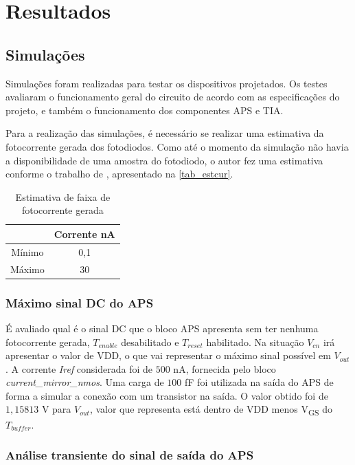 \chapter{Resultados}

\section{Simulações}

Simulações foram realizadas para testar os dispositivos projetados. Os testes avaliaram o funcionamento geral do circuito de acordo com as especificações do projeto, e também o funcionamento dos componentes APS e TIA.

Para a realização das simulações, é necessário se realizar uma estimativa da fotocorrente gerada dos fotodiodos. Como até o momento da simulação não havia a disponibilidade de uma amostra do fotodiodo, o autor fez uma estimativa conforme o trabalho de \cite{LidianeCampos}, apresentado na \autoref{tab_estcur}.

\begin{table}[!h]
\caption{Estimativa de faixa de fotocorrente gerada}
\label{tab_estcur}
\centering
\begin{tabular}{cc}
\toprule
& Corrente nA \\
\midrule \midrule
Mínimo & 0,1\\
\midrule
Máximo & 30\\
\bottomrule
\end{tabular}
\end{table}

\subsection{Máximo sinal DC do APS}
\label{DCAPS}

É avaliado qual é o sinal DC que o bloco APS apresenta sem ter nenhuma fotocorrente gerada, $T_{enable}$ desabilitado e $T_{reset}$ habilitado. Na situação $V_{cn}$ irá apresentar o valor de VDD, o que vai representar o máximo sinal possível em $V_{out}$. A corrente \textit{Iref} considerada foi de $500$ nA, fornecida pelo bloco \textit{current\_mirror\_nmos}. Uma carga de $100$ fF foi utilizada na saída do APS de forma a simular a conexão com  um transistor na saída. O valor obtido foi de $1,15813$ V para $V_{out}$, valor que representa está dentro de VDD menos V\textsubscript{GS} do $T_{buffer}$.

\subsection{Análise transiente do sinal de saída do APS}

